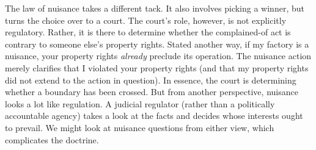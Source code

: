 The law of nuisance takes a different tack. It also involves picking a winner,
but turns the choice over to a court. The court's role, however, is not
explicitly regulatory. Rather, it is there to determine whether the
complained-of act is contrary to someone else's property rights. Stated another
way, if my factory is a nuisance, your property rights \textit{already} preclude
its operation. The nuisance action merely clarifies that I violated your
property rights (and that my property rights did not extend to the action in
question). In essence, the court is determining whether a boundary has been
crossed. But from another perspective, nuisance looks a lot like regulation. A
judicial regulator (rather than a politically accountable agency) takes a look
at the facts and decides whose interests ought to prevail. We might look at
nuisance questions from either view, which complicates the doctrine.

